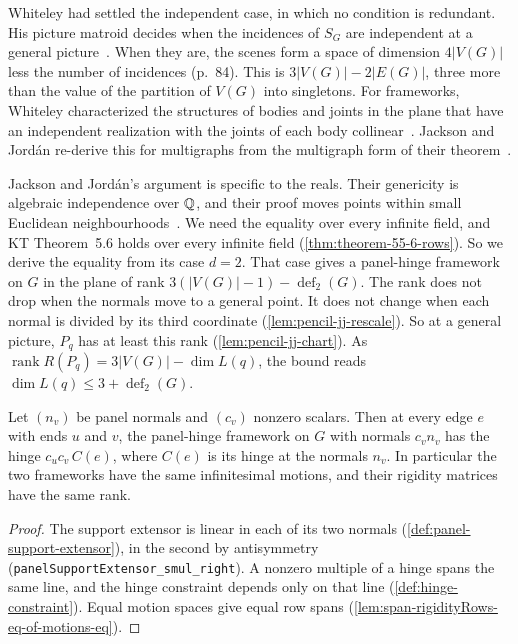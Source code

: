 Whiteley had settled the independent case, in which no condition is
redundant. His picture matroid decides when the incidences of $S_G$ are
independent at a general picture~\cite[Theorem~3.1]{whiteley1989}. When
they are, the scenes form a space of dimension $4|V(G)|$ less the number
of incidences (p.~84).
This is $3|V(G)| - 2|E(G)|$, three more than the value of the partition
of $V(G)$ into singletons. For frameworks, Whiteley characterized the
structures of bodies and joints in the plane that have an independent
realization with the joints of each body
collinear~\cite[Theorem~5.4]{whiteley1989}. Jackson and Jord\'an
re-derive this for multigraphs from the multigraph form of their
theorem~\cite[Theorem~7.4]{jacksonJordan2006pin}.

Jackson and Jord\'an's argument is specific to the reals. Their
genericity is algebraic independence over ${\mathbb{Q}}$, and their proof moves
points within small Euclidean
neighbourhoods~\cite[pp.~9, 12]{jacksonJordan2006pin}. We need the
equality over every infinite field, and KT Theorem~5.6 holds over every
infinite field (\cref{thm:theorem-55-6-rows}). So we derive the equality from its case
$d = 2$. That case gives a panel-hinge framework on $G$ in the plane of
rank $3(|V(G)| - 1) - \operatorname{def}_2(G)$. The rank does not drop
when the normals move to a general point. It does not change when each
normal is divided by its third coordinate (\cref{lem:pencil-jj-rescale}).
So at a general picture, $P_q$ has at least this rank
(\cref{lem:pencil-jj-chart}). As
$\operatorname{rank} R(P_q) = 3|V(G)| - \dim L(q)$, the bound reads
$\dim L(q) \le 3 + \operatorname{def}_2(G)$.

\begin{lemma}
  \label{lem:pencil-jj-rescale}
  \leanok
  Let $(n_v)$ be panel normals and $(c_v)$ nonzero scalars. Then at every
  edge $e$ with ends $u$ and $v$, the panel-hinge framework on $G$ with
  normals $c_v n_v$ has the hinge $c_u c_v\, C(e)$, where $C(e)$ is its
  hinge at the normals $n_v$. In particular the two frameworks have the
  same infinitesimal motions, and their rigidity matrices have the same
  rank.
\end{lemma}
\begin{proof}
  \leanok
  The support extensor is linear in each of its two normals
  (\cref{def:panel-support-extensor}), in the second by antisymmetry
  (\texttt{panelSupportExtensor\_\allowbreak{}smul\_\allowbreak{}right}). A
  nonzero multiple of a hinge spans the same line, and the hinge
  constraint depends only on that line
  (\cref{def:hinge-constraint}). Equal motion spaces give equal row spans
  (\cref{lem:span-rigidityRows-eq-of-motions-eq}).
\end{proof}


